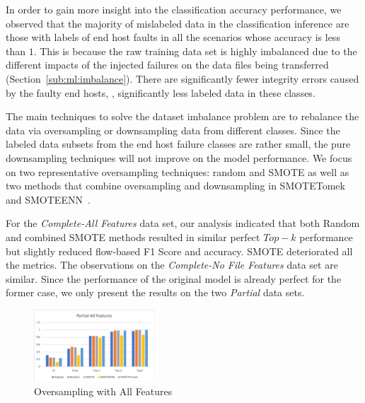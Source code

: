 In order to gain more insight into the classification accuracy performance, we observed that the majority of mislabeled data in the classification inference are those with labels of end host faults in all the scenarios whose accuracy is less than $1$.  This is because the raw training data set is highly imbalanced due to the different impacts of the injected failures on the data files being transferred (Section~\ref{sub:ml:imbalance}). There are significantly fewer integrity errors caused by the faulty end hosts, \ie, significantly less labeled data in these classes. 

The main techniques to solve the dataset imbalance problem are to rebalance the data via oversampling or downsampling data from different classes. Since the labeled data subsets from the end host failure classes are rather small, the pure downsampling techniques will not improve on the model performance. We focus on two representative oversampling techniques: random and SMOTE as well as two methods that combine oversampling and downsampling in SMOTETomek and SMOTEENN~\cite{imbalance-learn:web}.

For the  {\it Complete-All Features} data set, our analysis indicated that both Random and combined SMOTE methods resulted in similar perfect $Top-k$ performance but slightly reduced flow-based F1 Score and accuracy. SMOTE deteriorated all the metrics. The observations on the  {\it Complete-No File Features} data set are similar. Since the performance of the original model is already perfect for the former case, we only present the results on the two {\it Partial} data sets.

\begin{figure}[!ht]
\begin{center}
\includegraphics[width=0.4\textwidth]{./figure/partial-all-oversampling}
\end{center}
\vspace{-0.1in}
\caption{Oversampling with All Features}
\label{fig:os:all}
\vspace{-0.2in}
\end{figure}

